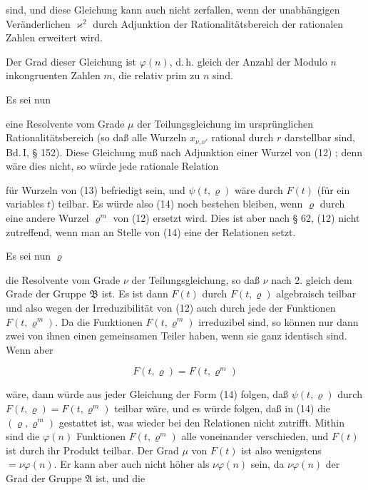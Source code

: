 sind, und diese Gleichung kann auch nicht zerfallen, wenn der unabhängigen Veränderlichen $\varkappa^2$ durch Adjunktion der Rationalitätsbereich der rationalen Zahlen erweitert wird. %

Der Grad dieser Gleichung ist $\varphi(n)$, d.\,h. gleich der Anzahl der Modulo $n$ inkongruenten Zahlen $m$, die relativ prim zu $n$ sind.

Es sei nun


eine  Resolvente vom Grade $\mu$ der Teilungsgleichung im ursprünglichen Rationalitätsbereich (so daß alle Wurzeln $x_{\nu,\nu'}$ rational durch $r$ darstellbar sind, Bd.\,I, § 152). Diese Gleichung muß nach Adjunktion einer Wurzel von (12) ; denn wäre dies nicht, so würde jede rationale Relation


für  Wurzeln von (13) befriedigt sein, und $\psi(t,\varrho)$ wäre durch $F(t)$ (für ein variables $t$) teilbar. Es würde also (14) noch bestehen bleiben, wenn $\varrho$ durch eine andere Wurzel $\varrho^m$ von (12) ersetzt wird. Dies ist aber nach § 62, (12) nicht zutreffend, wenn man an Stelle von (14) eine der  Relationen setzt.

Es sei nun  $\varrho$


die  Resolvente vom Grade $\nu$ der Teilungsgleichung, so daß $\nu$ nach 2. gleich dem Grade der Gruppe $\mathfrak{B}$ ist. Es ist dann $F(t)$ durch $F(t,\varrho)$ algebraisch teilbar und also wegen der Irreduzibilität von (12) auch durch jede der Funktionen $F(t,\varrho^m)$. Da die Funktionen $F(t,\varrho^m)$ irreduzibel sind, so können nur dann zwei von ihnen einen gemeinsamen Teiler haben, wenn sie ganz identisch sind. Wenn aber

\[
F(t,\varrho) = F(t,\varrho^m)
\]

wäre, dann würde aus jeder Gleichung der Form (14) folgen, daß $\psi(t,\varrho)$ durch $F(t,\varrho) = F(t,\varrho^m)$ teilbar wäre, und es würde folgen, daß in (14) die  $(\varrho,\varrho^m)$ gestattet ist, was wieder bei den  Relationen nicht zutrifft. Mithin sind die $\varphi(n)$ Funktionen $F(t,\varrho^m)$ alle voneinander verschieden, und $F(t)$ ist durch ihr Produkt teilbar. Der Grad $\mu$ von $F(t)$ ist also wenigstens $= \nu\varphi(n)$. Er kann aber auch nicht höher als $\nu\varphi(n)$ sein, da $\nu\varphi(n)$ der Grad der Gruppe $\mathfrak{A}$ ist, und die
